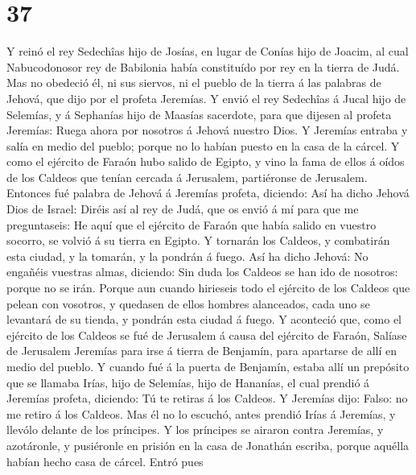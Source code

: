 \hypertarget{section-36}{%
\section{37}\label{section-36}}

 Y reinó el rey Sedechîas hijo de Josías, en lugar de
Conías hijo de Joacim, al cual Nabucodonosor rey de Babilonia había
constituído por rey en la tierra de Judá.  Mas no obedeció
él, ni sus siervos, ni el pueblo de la tierra á las palabras de Jehová,
que dijo por el profeta Jeremías.  Y envió el rey
Sedechîas á Jucal hijo de Selemías, y á Sephanías hijo de Maasías
sacerdote, para que dijesen al profeta Jeremías: Ruega ahora por
nosotros á Jehová nuestro Dios.  Y Jeremías entraba y
salía en medio del pueblo; porque no lo habían puesto en la casa de la
cárcel.  Y como el ejército de Faraón hubo salido de
Egipto, y vino la fama de ellos á oídos de los Caldeos que tenían
cercada á Jerusalem, partiéronse de Jerusalem.  Entonces
fué palabra de Jehová á Jeremías profeta, diciendo:  Así
ha dicho Jehová Dios de Israel: Diréis así al rey de Judá, que os envió
á mí para que me preguntaseis: He aquí que el ejército de Faraón que
había salido en vuestro socorro, se volvió á su tierra en Egipto.
 Y tornarán los Caldeos, y combatirán esta ciudad, y la
tomarán, y la pondrán á fuego.  Así ha dicho Jehová: No
engañéis vuestras almas, diciendo: Sin duda los Caldeos se han ido de
nosotros: porque no se irán.  Porque aun cuando hirieseis
todo el ejército de los Caldeos que pelean con vosotros, y quedasen de
ellos hombres alanceados, cada uno se levantará de su tienda, y pondrán
esta ciudad á fuego.  Y aconteció que, como el ejército
de los Caldeos se fué de Jerusalem á causa del ejército de Faraón,
 Salíase de Jerusalem Jeremías para irse á tierra de
Benjamín, para apartarse de allí en medio del pueblo.  Y
cuando fué á la puerta de Benjamín, estaba allí un prepósito que se
llamaba Irías, hijo de Selemías, hijo de Hananías, el cual prendió á
Jeremías profeta, diciendo: Tú te retiras á los Caldeos. 
Y Jeremías dijo: Falso: no me retiro á los Caldeos. Mas él no lo
escuchó, antes prendió Irías á Jeremías, y llevólo delante de los
príncipes.  Y los príncipes se airaron contra Jeremías, y
azotáronle, y pusiéronle en prisión en la casa de Jonathán escriba,
porque aquélla habían hecho casa de cárcel.  Entró pues
